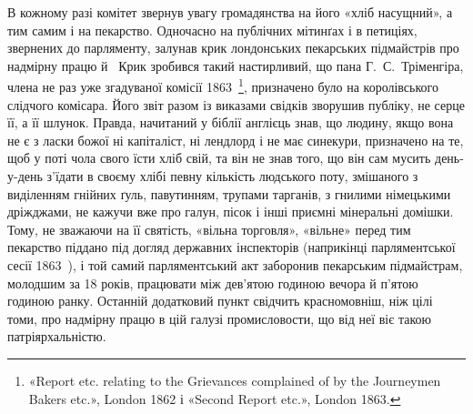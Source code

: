 В кожному разі комітет звернув увагу громадянства на його
«хліб насущний», а тим самим і на пекарство. Одночасно на публічних
мітинґах і в петиціях, звернених до парляменту, залунав
крик лондонських пекарських підмайстрів про надмірну працю
й~ Крик зробився такий настирливий, що пана Г.~С.~Тріменгіра,
члена не раз уже згадуваної комісії 1863~\footnote{
«Report etc. relating to the Grievances complained of by the
Journeymen Bakers etc.», London 1862 і «Second Report etc.», London
1863.
}, призначено
було на королівського слідчого комісара. Його звіт разом із виказами
свідків зворушив публіку, не серце її, а її шлунок. Правда,
начитаний у біблії англієць знав, що людину, якщо вона не є з
ласки божої ні капіталіст, ні лендлорд і не має синекури, призначено
на те, щоб у поті чола свого їсти хліб свій, та він не знав
того, що він сам мусить день-у-день з’їдати в своєму хлібі
певну кількість людського поту, змішаного з виділенням гнійних
ґуль, павутинням, трупами тарганів, з гнилими німецькими дріжджами,
не кажучи вже про галун, пісок і інші приємні мінеральні
домішки. Тому, не зважаючи на її святість, «вільна торговля»,
«вільне» перед тим пекарство піддано під догляд державних
інспекторів (наприкінці парляментської сесії 1863~), і той самий
парляментський акт заборонив пекарським підмайстрам, молодшим
за 18 років, працювати між дев’ятою годиною вечора й п’ятою
годиною ранку. Останній додатковий пункт свідчить красномовніш,
ніж цілі томи, про надмірну працю в цій галузі промисловости,
що від неї віє такою патріярхальністю.

